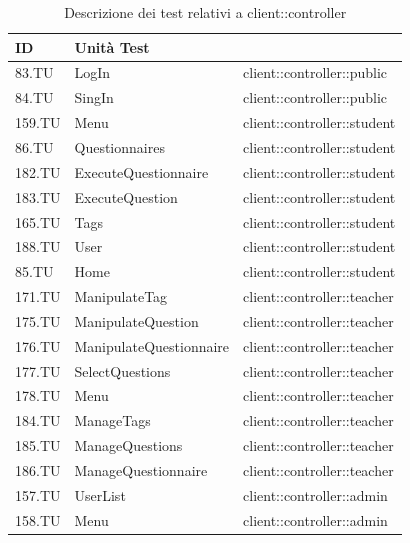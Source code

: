 \documentclass[12pt,a4paper]{article}
\begin{document}
\begin{table}[H]
	\begin{center}
		\begin{tabular}{p{} p{} p{}}
			\toprule
			\textbf{ID}   & \textbf{Unità Test}	& \textbf{\mgls{package}} \\ \midrule
			\midrule
			83.TU & LogIn & client::controller::public\\ \midrule
			84.TU & SingIn & client::controller::public\\ \midrule
			159.TU & Menu & client::controller::student\\ \midrule
			86.TU & Questionnaires & client::controller::student\\ \midrule
			182.TU & ExecuteQuestionnaire & client::controller::student\\ \midrule
			183.TU & ExecuteQuestion & client::controller::student\\ \midrule
			165.TU & Tags & client::controller::student\\ \midrule
			188.TU & User & client::controller::student\\ \midrule
			85.TU & Home & client::controller::student\\ \midrule
			171.TU & ManipulateTag & client::controller::teacher\\ \midrule
			175.TU & ManipulateQuestion & client::controller::teacher\\ \midrule
			176.TU & ManipulateQuestionnaire & client::controller::teacher\\ \midrule
			177.TU & SelectQuestions & client::controller::teacher\\ \midrule
			178.TU & Menu & client::controller::teacher\\ \midrule
			184.TU & ManageTags & client::controller::teacher\\ \midrule
			185.TU & ManageQuestions & client::controller::teacher\\ \midrule
			186.TU & ManageQuestionnaire & client::controller::teacher\\ \midrule
			157.TU & UserList & client::controller::admin\\ \midrule
			158.TU & Menu & client::controller::admin\\ \midrule			
		 \bottomrule
		\end{tabular}
	\end{center}
	\caption{Descrizione dei test relativi a client::controller}
\end{table}
\end{document}
